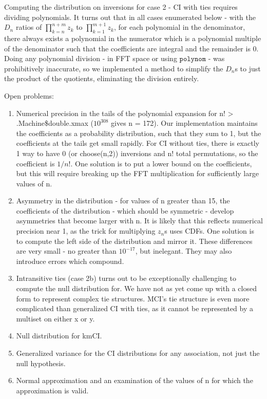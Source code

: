 \documentclass{article}
\begin{document}
Computing the distribution on inversions for case 2 - CI with ties requires dividing polynomials.  It turns out that in all cases enumerated below - with the $D_{n}$ ratios of $\prod_{k=n}^{n+m}z_{k}$ to $\prod_{k=1}^{m+1} z_{k}$, for each polynomial in the denominator, there always exists a polynomial in the numerator which is a polynomial multiple of the denominator such that the coefficients are integral and the remainder is 0.  Doing any polynomial division - in FFT space or using $\texttt{polynom}$ - was prohibitively inaccurate, so we implemented a method to simplify the $D_{n}$s to just the product of the quotients, eliminating the division entirely. 

Open problems:
\begin{enumerate}
\item Numerical precision in the tails of the polynomial expansion for n! > .Machine\$double.xmax ($10^{308}$ gives n = 172).  Our implementation maintains the coefficients as a probability distribution, such that they sum to 1, but the coefficients at the tails get small rapidly.  For CI without ties, there is exactly 1 way to have 0 (or choose(n,2)) inversions and n! total permutations, so the coefficient is $1/n!$.  One solution is to put a lower bound on the coefficients, but this will require breaking up the FFT multiplication for sufficiently large values of n. 
\item Asymmetry in the distribution - for values of n greater than 15, the coefficients of the distribution - which should be symmetric - develop asymmetries that become larger with n.  It is likely that this reflects numerical precision near 1, as the trick for multiplying $z_{n}$s uses CDFs.  One solution is to compute the left side of the distribution and mirror it.  These differences are very small - no greater than $10^{-17}$, but inelegant.  They may also introduce errors which compound. 
\item Intransitive ties (case 2b) turns out to be exceptionally challenging to compute the null distribution for.  We have not as yet come up with a closed form to represent complex tie structures.  MCI's tie structure is even more complicated than generalized CI with ties, as it cannot be represented by a multiset on either x or y.
\item Null distribution for kmCI.  
\item Generalized variance for the CI distributions for any association, not just the null hypothesis. 
\item Normal approximation and an examination of the values of n for which the approximation is valid.
\end{enumerate}
\end{document}
